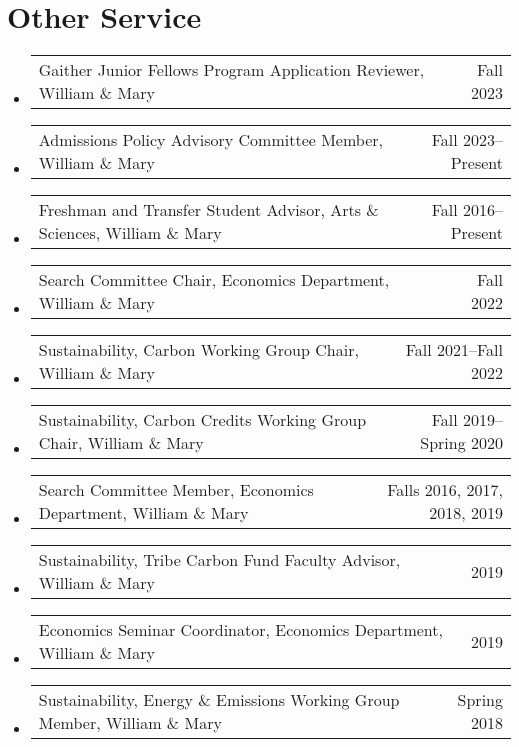 \documentclass[10pt,letterpaper,en-US]{article}
\makeatletter
\newcommand{\itemrow}[2]
{\begin{tabular*}{\linewidth}{l@{\extracolsep{\fill}}r}
	#1 & #2 \\
\end{tabular*}}
\makeatother
\begin{document}
\section*{Other Service}
\begin{itemize}
    \item \itemrow{Gaither Junior Fellows Program Application Reviewer, William \& Mary}{Fall 2023}
    \item \itemrow{Admissions Policy Advisory Committee Member, William \& Mary}{Fall 2023--Present}
    \item \itemrow{Freshman and Transfer Student Advisor, Arts \& Sciences, William \& Mary}{Fall 2016--Present}
    \item \itemrow{Search Committee Chair, Economics Department, William \& Mary}{Fall 2022}
    \item \itemrow{Sustainability, Carbon Working Group Chair, William \& Mary}{Fall 2021--Fall 2022}
    \item \itemrow{Sustainability, Carbon Credits Working Group Chair, William \& Mary}{Fall 2019--Spring 2020}
    \item \itemrow{Search Committee Member, Economics Department, William \& Mary}{Falls 2016, 2017, 2018, 2019}
    \item \itemrow{Sustainability, Tribe Carbon Fund Faculty Advisor, William \& Mary}{2019}
    \item \itemrow{Economics Seminar Coordinator, Economics Department, William \& Mary}{2019}
    \item \itemrow{Sustainability, Energy \& Emissions Working Group Member, William \& Mary}{Spring 2018}
\end{itemize}
\end{document}
